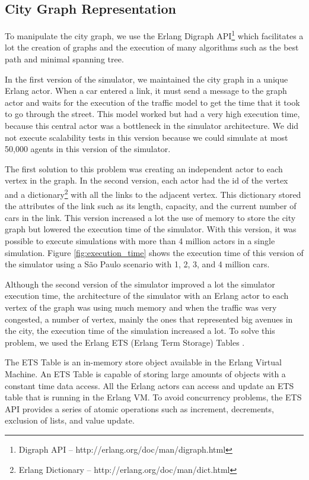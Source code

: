\subsection{City Graph Representation}

To manipulate the city graph, we use the Erlang Digraph API\footnote{Digraph API -- http://erlang.org/doc/man/digraph.html} which facilitates a lot the creation of graphs and the execution of many algorithms such as the best path and minimal spanning tree.

In the first version of the simulator, we maintained the city graph in a unique Erlang actor. When a car entered a link, it must send a message to the graph actor and waits for the execution of the traffic model to get the time that it took to go through the street. This model worked but had a very high execution time, because this central actor was a bottleneck in the simulator architecture. We did not execute scalability tests in this version because we could simulate at most 50,000 agents in this version of the simulator.

The first solution to this problem was creating an independent actor to each vertex in the graph. In the second version, each actor had the id of the vertex and a dictionary\footnote{Erlang Dictionary -- http://erlang.org/doc/man/dict.html} with all the links to the adjacent vertex. This dictionary stored the attributes of the link such as its length, capacity, and the current number of cars in the link. This version increased a lot the use of memory to store the city graph but lowered the execution time of the simulator. With this version, it was possible to execute simulations with more than 4 million actors in a single simulation. Figure \ref{fig:execution_time} shows the execution time of this version of the simulator using a S\~ao Paulo scenario with 1, 2, 3, and 4 million cars.

Although the second version of the simulator improved a lot the simulator execution time, the architecture of the simulator with an Erlang actor to each vertex of the graph was using much memory and when the traffic was very congested, a number of vertex, mainly the ones that represented big avenues in the city, the execution time of the simulation increased a lot. To solve this problem, we used the Erlang ETS (Erlang Term Storage) Tables \cite{aronis2017shared}.

The ETS Table is an in-memory store object available in the Erlang Virtual Machine. An ETS Table is capable of storing large amounts of objects with a constant time data access. All the Erlang actors can access and update an ETS table that is running in the Erlang VM. To avoid concurrency problems, the ETS API provides a series of atomic operations such as increment, decrements, exclusion of lists, and value update.

